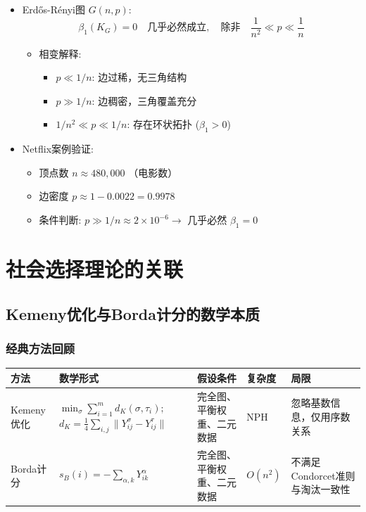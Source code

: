 \documentclass[a4paper]{article}
\begin{document}
\begin{itemize}
    \item Erdős-Rényi图 $G(n,p)$:
    $$
    \beta_1(K_G) = 0 \quad \text{几乎必然成立}, \quad \text{除非} \quad \frac{1}{n^2} \ll p \ll \frac{1}{n}
    $$
    \begin{itemize}
        \item 相变解释:
        \begin{itemize}
            \item $p \ll 1/n$: 边过稀，无三角结构
            \item $p \gg 1/n$: 边稠密，三角覆盖充分
            \item $1/n^2 \ll p \ll 1/n$: 存在环状拓扑 ($\beta_1 > 0$)
        \end{itemize}
    \end{itemize}
    
    \item Netflix案例验证:
    \begin{itemize}
        \item 顶点数 $n \approx 480,000$ （电影数）
        \item 边密度 $p \approx 1 - 0.0022 = 0.9978$
        \item 条件判断: $p \gg 1/n \approx 2 \times 10^{-6} \rightarrow$ 几乎必然 $\beta_1 = 0$
    \end{itemize}
\end{itemize}


\section{社会选择理论的关联}
\subsection{Kemeny优化与Borda计分的数学本质}

\subsubsection{经典方法回顾}

\begin{table}[h]
    \centering
    \begin{tabular}{m{1.5cm} m{4cm} m{2.5cm} m{2cm} m{3cm}}
        \textbf{方法} & \textbf{数学形式} & \textbf{假设条件} & \textbf{复杂度} & \textbf{局限} \\
        \hline
        Kemeny优化 & $\min_{\sigma} \sum_{i=1}^{m} d_K(\sigma, \tau_i); $
            $d_K = \frac{1}{4} \sum_{i,j} \| Y_{ij}^{\sigma} - Y_{ij}^{\tau} \|$
        & 完全图、平衡权重、二元数据 & NPH & 忽略基数信息，仅用序数关系 \\
        \hline
        Borda计分 & $s_B(i) = -\sum_{\alpha,k} Y_{ik}^{\alpha}$ & 完全图、平衡权重、二元数据 & $O(n^2)$ & 不满足Condorcet准则与淘汰一致性 \\
    \end{tabular}
\end{table}
\end{document}
